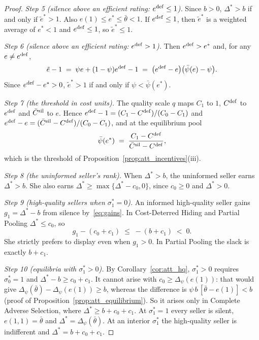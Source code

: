 \begin{proof}
\emph{Step 5 (silence above an efficient rating: $e^{\rm def}\le1$).} Since $b>0$, $\Delta^*>b$ if and only if $\tilde e^*>1$. Also $e(1)\le e^*\le\bar\theta<1$. If $e^{\rm def}\le1$, then $\tilde e^*$ is a weighted average of $e^*<1$ and $e^{\rm def}\le1$, so $\tilde e^*\le1$.

\emph{Step 6 (silence above an efficient rating: $e^{\rm def}>1$).} Then $e^{\rm def}>e^*$ and, for any $e\neq e^{\rm def}$,
\begin{equation*}
    \tilde e-1\;=\;\psi e+(1-\psi)e^{\rm def}-1\;=\;\big(e^{\rm def}-e\big)\big(\bar\psi(e)-\psi\big).
\end{equation*}
Since $e^{\rm def}-e^*>0$, $\tilde e^*>1$ if and only if $\psi<\bar\psi(e^*)$.

\emph{Step 7 (the threshold in cost units).} The quality scale $q$ maps $C_1$ to $1$, $C^{\rm def}$ to $e^{\rm def}$ and $\bar C^{\rm sil}$ to $e$. Hence $e^{\rm def}-1=(C_1-C^{\rm def})/(C_0-C_1)$ and $e^{\rm def}-e=(\bar C^{\rm sil}-C^{\rm def})/(C_0-C_1)$, and at the equilibrium pool
\begin{equation*}
    \bar\psi(e^*)\;=\;\frac{C_1-C^{\rm def}}{\bar C^{\rm sil}-C^{\rm def}},
\end{equation*}
which is the threshold of Proposition~\ref{prop:att_incentives}(iii).

\emph{Step 8 (the uninformed seller's rank).} When $\Delta^*>b$, the uninformed seller earns $\Delta^*>b$. She also earns $\Delta^*\ge\max\{\Delta^*-c_0,0\}$, since $c_0\ge0$ and $\Delta^*>0$.

\emph{Step 9 (high-quality sellers when $\sigma_1^*=0$).} An informed high-quality seller gains $g_1=\Delta^*-b$ from silence by~\eqref{eq:gains}. In Cost-Deterred Hiding and Partial Pooling $\Delta^*\le c_0$, so
\begin{equation*}
    g_1-(c_0+c_1)\;\le\;-(b+c_1)\;<\;0 .
\end{equation*}
She strictly prefers to display even when $g_1>0$. In Partial Pooling the slack is exactly $b+c_1$.

\emph{Step 10 (equilibria with $\sigma_1^*>0$).} By Corollary~\ref{cor:att_hq}, $\sigma_1^*>0$ requires $\sigma_0^*=1$ and $\Delta^*-b\ge c_0+c_1$. It cannot arise with $c_0\ge\Delta_\psi(e(1))$: that would give $\Delta_\psi(\bar\theta)-\Delta_\psi(e(1))\ge b$, whereas the difference is $\psi\,b\,[\bar\theta-e(1)]<b$ (proof of Proposition~\ref{prop:att_equilibrium}). So it arises only in Complete Adverse Selection, where $\Delta^*\ge b+c_0+c_1$. At $\sigma_1^*=1$ every seller is silent, $e(1,1)=\bar\theta$ and $\Delta^*=\Delta_\psi(\bar\theta)$. At an interior $\sigma_1^*$ the high-quality seller is indifferent and $\Delta^*=b+c_0+c_1$.
\end{proof}

